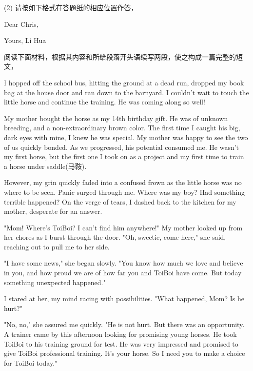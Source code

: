 \documentclass{英语试卷}
\begin{document}
\par (2) 请按如下格式在答题纸的相应位置作答，\par
\par Dear Chris,\par
\par Yours, Li Hua\par
{}
\par 阅读下面材料，根据其内容和所给段落开头语续写两段，使之构成一篇完整的短文，\par
\par I hopped off the school bus, hitting the ground at a dead run, dropped my book bag at the house door and ran down to the barnyard. I couldn't wait to touch the little horse and continue the training. He was coming along so well!\par
\par My mother bought the horse as my 14th birthday gift. He was of unknown breeding, and a non-extraordinary brown color. The first time I caught his big, dark eyes with mine, I knew he was special. My mother was happy to see the two of us quickly bonded. As we progressed, his potential consumed me. He wasn't my first horse, but the first one I took on as a project and my first time to train a horse under saddle(马鞍).\par
\par However, my grin quickly faded into a confused frown as the little horse was no where to be seen. Panic surged through me. Where was my boy? Had something terrible happened? On the verge of tears, I dashed back to the kitchen for my mother, desperate for an answer.\par
\par "Mom! Where's ToiBoi? I can't find him anywhere!" My mother looked up from her chores as I burst through the door. "Oh, sweetie, come here," she said, reaching out to pull me to her side.\par
\par "I have some news," she began slowly. "You know how much we love and believe in you, and how proud we are of how far you and ToiBoi have come. But today something unexpected happened."\par
\par I stared at her, my mind racing with possibilities. "What happened, Mom? Is he hurt?"\par
\par "No, no," she assured me quickly. "He is not hurt. But there was an opportunity. A trainer came by this afternoon looking for promising young horses. He took ToiBoi to his training ground for test. He was very impressed and promised to give ToiBoi professional training. It's your horse. So I need you to make a choice for ToiBoi today."\par
\end{document}
